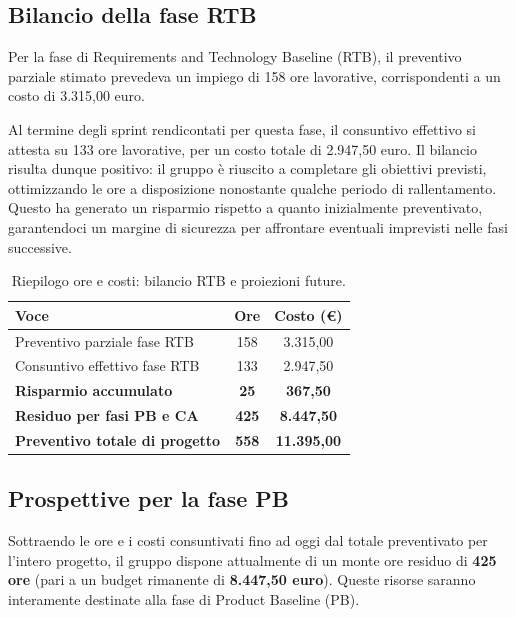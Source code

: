 \documentclass[11pt,a4paper]{article}
\begin{document}
\subsection*{Bilancio della fase RTB}
Per la fase di Requirements and Technology Baseline (RTB), il preventivo parziale stimato prevedeva un impiego di 158 ore lavorative, corrispondenti a un costo di 3.315,00 euro. 

Al termine degli sprint rendicontati per questa fase, il consuntivo effettivo si attesta su 133 ore lavorative, per un costo totale di 2.947,50 euro. Il bilancio risulta dunque positivo: il gruppo è riuscito a completare gli obiettivi previsti, ottimizzando le ore a disposizione nonostante qualche periodo di rallentamento. Questo ha generato un risparmio rispetto a quanto inizialmente preventivato, garantendoci un margine di sicurezza per affrontare eventuali imprevisti nelle fasi successive.

\begin{table}[H]
    \centering
    \renewcommand{\arraystretch}{1.3} %
    \begin{tabular}{|l|c|c|}
        \hline
        \textbf{Voce} & \textbf{Ore} & \textbf{Costo (€)} \\
        \hline
        Preventivo parziale fase RTB & 158 & 3.315,00 \\
        Consuntivo effettivo fase RTB & 133 & 2.947,50 \\
        \hline
        \textbf{Risparmio accumulato} & \textbf{25} & \textbf{367,50} \\
        \hline\hline
        \textbf{Residuo per fasi PB e CA} & \textbf{425} & \textbf{8.447,50} \\
        \hline
        \textbf{Preventivo totale di progetto} & \textbf{558} & \textbf{11.395,00} \\
        \hline
    \end{tabular}
    \vspace{0.2cm}
    \caption{Riepilogo ore e costi: bilancio RTB e proiezioni future.}
\end{table}

\subsection*{Prospettive per la fase PB}
Sottraendo le ore e i costi consuntivati fino ad oggi dal totale preventivato per l'intero progetto, il gruppo dispone attualmente di un monte ore residuo di \textbf{425 ore} (pari a un budget rimanente di \textbf{8.447,50 euro}). Queste risorse saranno interamente destinate alla fase di Product Baseline (PB).
\end{document}
